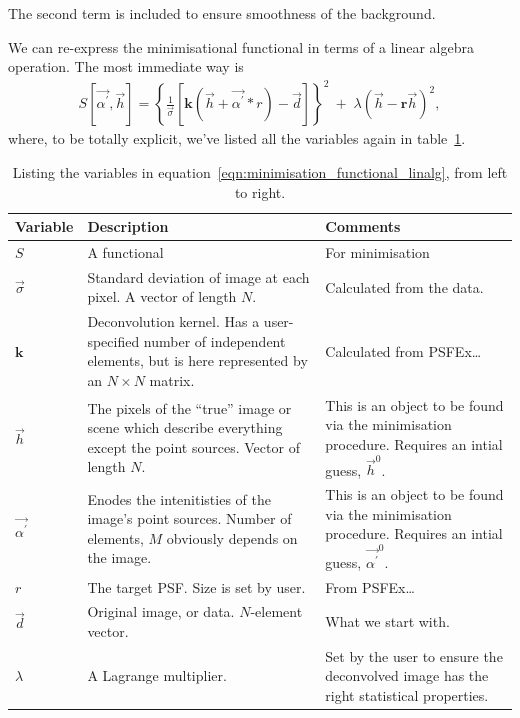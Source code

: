 \documentclass[letterpaper, 11pt]{article}
\begin{document}
The second term is included to ensure smoothness of the background.

We can re-express the minimisational functional in terms of a linear algebra operation. The most immediate way is
\begin{align}
	S\left[\vec{\alpha^\prime}, \vec{h}\right] = \left\{ \frac{1}{\vec\sigma} \left[ \mathbf k \left( \vec{h} + \vec{\alpha^\prime} \ast r \right) - \vec{d} \right]\right\}^2\
			+\; \lambda \left( \vec{h} - \mathbf{r}\vec{h} \right)^2, \label{eqn:minimisation_functional_linalg}
\end{align}
where, to be totally explicit, we've listed all the variables again in table~\ref{tbl:minimisation_functional_linalg}.

\begin{center}
	\begin{table}[h!]
		\begin{tabularx}{\textwidth}{l | X | X}
			\hline
			Variable	& Description & Comments\\ \hline
			$S$ 	& A functional & For minimisation\\ \hline
			$\vec\sigma$ & Standard deviation of image at each pixel. A vector of length $N$. & Calculated from the data.\\ \hline
			$\mathbf k$	& Deconvolution kernel. Has a user-specified number of independent elements, but is here represented by an $N\!\times\!N$ matrix. & Calculated from PSFEx\ldots\\ \hline
			$\vec h$		& The pixels of the ``true'' image or scene which describe everything except the point sources. Vector of length $N$. & This is an object to be found via the minimisation procedure. Requires an intial guess, $\vec h^0$.\\ \hline
			$\vec{\alpha^\prime}$	& Enodes the intenitisties of the image's point sources. Number of elements, $M$ obviously depends on the image. & This is an object to be found via the minimisation procedure. Requires an intial guess, $\vec{\alpha^\prime}^0$.\\ \hline
			$r$	& The target PSF. Size is set by user. & From PSFEx\ldots\\ \hline 
			$\vec d$	& Original image, or data. $N$-element vector. & What we start with.\\ \hline
			$\lambda$	& A Lagrange multiplier. & Set by the user to ensure the deconvolved image has the right statistical properties.\\
			\hline
		\end{tabularx}
		\caption{Listing the variables in equation~\ref{eqn:minimisation_functional_linalg}, from left to right.}
		\label{tbl:minimisation_functional_linalg}
	\end{table}
\end{center}
\end{document}

